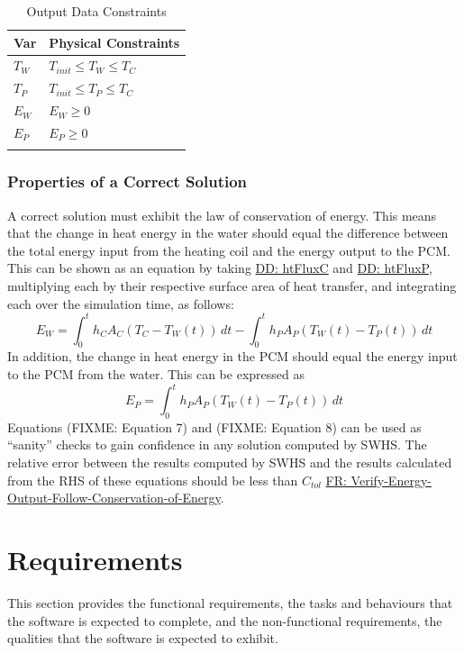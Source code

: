 \documentclass[12pt]{article}
\begin{document}
\begin{longtable}{l l}
\toprule
\textbf{Var} & \textbf{Physical Constraints}
\\
\midrule
\endhead
${T_{W}}$ & ${T_{init}}\leq{}{T_{W}}\leq{}{T_{C}}$
\\
${T_{P}}$ & ${T_{init}}\leq{}{T_{P}}\leq{}{T_{C}}$
\\
${E_{W}}$ & ${E_{W}}\geq{}0$
\\
${E_{P}}$ & ${E_{P}}\geq{}0$
\\
\bottomrule
\caption{Output Data Constraints}
\label{Table:OutDataConstraints}
\end{longtable}
\subsubsection{Properties of a Correct Solution}
\label{Sec:CorSolProps}
A correct solution must exhibit the law of conservation of energy. This means that the change in heat energy in the water should equal the difference between the total energy input from the heating coil and the energy output to the PCM. This can be shown as an equation by taking \hyperref[DD:htFluxC]{DD: htFluxC} and \hyperref[DD:htFluxP]{DD: htFluxP}, multiplying each by their respective surface area of heat transfer, and integrating each over the simulation time, as follows:
\begin{displaymath}
{E_{W}}=\int_{0}^{t}{{h_{C}} {A_{C}} \left({T_{C}}-{T_{W}}\left(t\right)\right)}\,dt-\int_{0}^{t}{{h_{P}} {A_{P}} \left({T_{W}}\left(t\right)-{T_{P}}\left(t\right)\right)}\,dt
\end{displaymath}
In addition, the change in heat energy in the PCM should equal the energy input to the PCM from the water. This can be expressed as
\begin{displaymath}
{E_{P}}=\int_{0}^{t}{{h_{P}} {A_{P}} \left({T_{W}}\left(t\right)-{T_{P}}\left(t\right)\right)}\,dt
\end{displaymath}
Equations (FIXME: Equation 7) and (FIXME: Equation 8) can be used as ``sanity'' checks to gain confidence in any solution computed by SWHS. The relative error between the results computed by SWHS and the results calculated from the RHS of these equations should be less than ${C_{tol}}$ \hyperref[verifyEnergyOutput]{FR: Verify-Energy-Output-Follow-Conservation-of-Energy}.
\section{Requirements}
\label{Sec:Requirements}
This section provides the functional requirements, the tasks and behaviours that the software is expected to complete, and the non-functional requirements, the qualities that the software is expected to exhibit.
\end{document}
